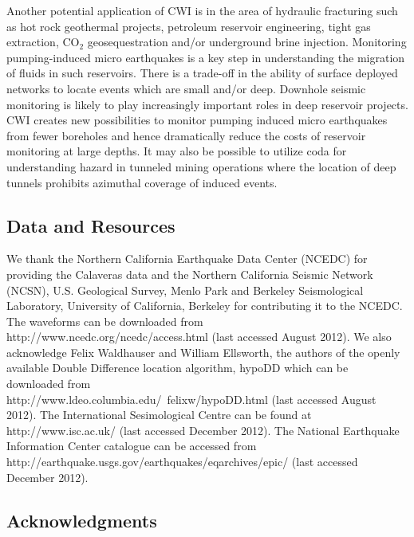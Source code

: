 \documentclass[12pt,double]{article}
\begin{document}
Another potential application of CWI is in the area of hydraulic
fracturing such as hot rock geothermal projects, petroleum reservoir engineering,
tight gas extraction, CO$_2$ geosequestration and/or underground brine injection.
Monitoring pumping-induced micro earthquakes
is a key step in understanding the migration of fluids in such
reservoirs. There is a trade-off in the ability of surface deployed
networks to locate events which are small and/or deep. Downhole
seismic monitoring is likely to play increasingly important roles in
deep reservoir projects. CWI creates new possibilities to monitor
pumping induced micro earthquakes from fewer boreholes and hence
dramatically reduce the costs of reservoir monitoring at large
depths. It may also be possible to utilize coda for understanding
hazard in tunneled mining operations where the location of deep
tunnels prohibits azimuthal coverage of induced events.

\vspace{2em}
\begin{centering}
\section*{Data and Resources}
\end{centering}
We thank the Northern California Earthquake Data Center (NCEDC) for
providing the Calaveras data and the Northern California Seismic
Network (NCSN), U.S. Geological Survey, Menlo Park and Berkeley
Seismological Laboratory, University of California, Berkeley for
contributing it to the NCEDC. The waveforms can be downloaded from \\
http://www.ncedc.org/ncedc/access.html (last accessed August 2012). 
We also acknowledge Felix
Waldhauser and William Ellsworth, the authors of the openly
available Double Difference location algorithm, hypoDD which can be
downloaded from \\
http://www.ldeo.columbia.edu/~felixw/hypoDD.html
(last accessed August 2012).
The International Sesimological Centre can be found at \\
http://www.isc.ac.uk/ (last accessed December 2012).
The National Earthquake
Information
Center catalogue can be accessed from \\
http://earthquake.usgs.gov/earthquakes/eqarchives/epic/
(last accessed December 2012).

\vspace{2em}
\begin{centering}
\section*{Acknowledgments}
\end{centering}
\end{document}
